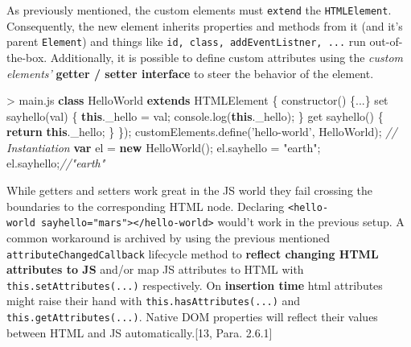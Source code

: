 \documentclass[]{assets/latex/ieee}
\newenvironment{Shaded}{}{}
\newcommand{\KeywordTok}[1]{\textcolor[rgb]{0.00,0.44,0.13}{\textbf{{#1}}}}
\newcommand{\StringTok}[1]{\textcolor[rgb]{0.25,0.44,0.63}{{#1}}}
\newcommand{\CommentTok}[1]{\textcolor[rgb]{0.38,0.63,0.69}{\textit{{#1}}}}
\newcommand{\VariableTok}[1]{\textcolor[rgb]{0.10,0.09,0.49}{{#1}}}
\newcommand{\ControlFlowTok}[1]{\textcolor[rgb]{0.00,0.44,0.13}{\textbf{{#1}}}}
\newcommand{\OperatorTok}[1]{\textcolor[rgb]{0.40,0.40,0.40}{{#1}}}
\newcommand{\AttributeTok}[1]{\textcolor[rgb]{0.49,0.56,0.16}{{#1}}}
\newcommand{\NormalTok}[1]{{#1}}
\begin{document}
As previously mentioned, the custom elements must \texttt{extend} the
\texttt{HTMLElement}. Consequently, the new element inherits properties
and methods from it (and it's parent \texttt{Element}) and things like
\texttt{id,\ class,\ addEventListner,\ ...} run out-of-the-box.
Additionally, it is possible to define custom attributes using the
\emph{custom elements'} \textbf{getter / setter interface} to steer the
behavior of the element.

\begin{Shaded}
\begin{Highlighting}[]
\OperatorTok{>} \VariableTok{main}\NormalTok{.}\AttributeTok{js}
\KeywordTok{class} \NormalTok{HelloWorld }\KeywordTok{extends} \NormalTok{HTMLElement }\OperatorTok{\{}
 \AttributeTok{constructor}\NormalTok{() }\OperatorTok{\{}\NormalTok{...}\OperatorTok{\}}
 \NormalTok{set }\AttributeTok{sayhello}\NormalTok{(val) }\OperatorTok{\{}
  \KeywordTok{this}\NormalTok{.}\AttributeTok{_hello} \OperatorTok{=} \NormalTok{val}\OperatorTok{;}
  \VariableTok{console}\NormalTok{.}\AttributeTok{log}\NormalTok{(}\KeywordTok{this}\NormalTok{.}\AttributeTok{_hello}\NormalTok{)}\OperatorTok{;}
 \OperatorTok{\}}
 \NormalTok{get }\AttributeTok{sayhello}\NormalTok{() }\OperatorTok{\{}
  \ControlFlowTok{return} \KeywordTok{this}\NormalTok{.}\AttributeTok{_hello}\OperatorTok{;}
 \OperatorTok{\}}
\OperatorTok{\}}\NormalTok{)}\OperatorTok{;}
\VariableTok{customElements}\NormalTok{.}\AttributeTok{define}\NormalTok{(}\StringTok{'hello-world'}\OperatorTok{,} \NormalTok{HelloWorld)}\OperatorTok{;}
\CommentTok{// Instantiation}
\KeywordTok{var} \NormalTok{el }\OperatorTok{=} \KeywordTok{new} \AttributeTok{HelloWorld}\NormalTok{()}\OperatorTok{;}
\VariableTok{el}\NormalTok{.}\AttributeTok{sayhello} \OperatorTok{=} \StringTok{"earth"}\OperatorTok{;}
\VariableTok{el}\NormalTok{.}\AttributeTok{sayhello}\OperatorTok{;}\CommentTok{//"earth"}
\end{Highlighting}
\end{Shaded}

While getters and setters work great in the JS world they fail crossing
the boundaries to the corresponding HTML node. Declaring
\texttt{\textless{}hello-world\ sayhello="mars"\textgreater{}\textless{}/hello-world\textgreater{}}
would't work in the previous setup. A common workaround is archived by
using the previous mentioned \texttt{attributeChangedCallback} lifecycle
method to \textbf{reflect changing HTML attributes to JS} and/or map JS
attributes to HTML with \texttt{this.setAttributes(...)} respectively.
On \textbf{insertion time} html attributes might raise their hand with
\texttt{this.hasAttributes(...)} and \texttt{this.getAttributes(...)}.
Native DOM properties will reflect their values between HTML and JS
automatically.{[}13, Para. 2.6.1{]}
\end{document}
